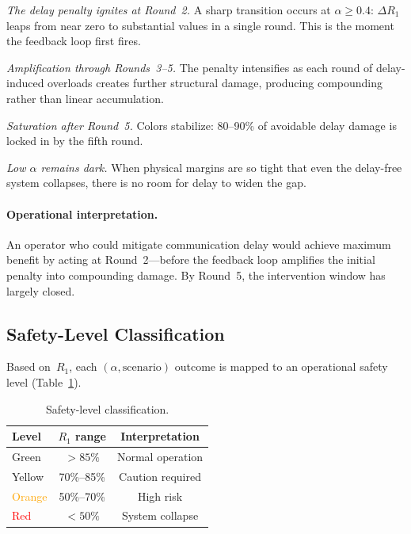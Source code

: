\documentclass[a4paper,fleqn]{cas-dc}
\newcommand{\Rone}{R_1}
\begin{document}
\emph{The delay penalty ignites at Round~2.}  A sharp transition occurs
at $\alpha\geq0.4$: $\Delta\Rone$ leaps from near zero to substantial
values in a single round.  This is the moment the feedback loop first
fires.

\emph{Amplification through Rounds~3--5.}  The penalty intensifies as
each round of delay-induced overloads creates further structural damage,
producing compounding rather than linear accumulation.

\emph{Saturation after Round~5.}  Colors stabilize: 80--90\% of
avoidable delay damage is locked in by the fifth round.

\emph{Low $\alpha$ remains dark.}  When physical margins are so tight
that even the delay-free system collapses, there is no room for delay to
widen the gap.

\paragraph{Operational interpretation.}
An operator who could mitigate communication delay would achieve maximum
benefit by acting at Round~2---before the feedback loop amplifies the
initial penalty into compounding damage.  By Round~5, the intervention
window has largely closed.

\subsection{Safety-Level Classification}\label{sec:safety}

Based on~$\Rone$, each $(\alpha,\text{scenario})$ outcome is mapped to
an operational safety level (Table~\ref{tbl:safety}).

\begin{table}[t]
\caption{Safety-level classification.}\label{tbl:safety}
\centering
\begin{tabular}{@{}lcc@{}}
\toprule
Level & $\Rone$ range & Interpretation \\
\midrule
\textcolor{green!70!black}{Green}
  & $>85\%$ & Normal operation \\
\textcolor{yellow!80!black}{Yellow}
  & 70\%--85\% & Caution required \\
\textcolor{orange}{Orange}
  & 50\%--70\% & High risk \\
\textcolor{red}{Red}
  & $<50\%$ & System collapse \\
\bottomrule
\end{tabular}
\end{table}
\end{document}
